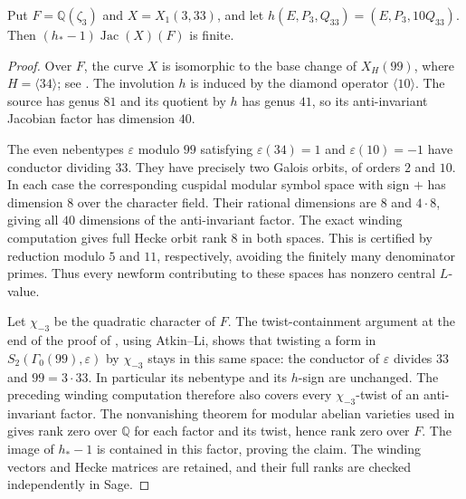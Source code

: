 \begin{lemma}\label{lem:decic333-finite-image}
Put $F=\mathbb Q(\zeta_3)$ and $X=X_1(3,33)$, and let
$h(E,P_3,Q_{33})=(E,P_3,10Q_{33})$.
Then $(h_*-1)\operatorname{Jac}(X)(F)$ is finite.
\end{lemma}
\begin{proof}
Over $F$, the curve $X$ is isomorphic to the base change of
$X_H(99)$, where $H=\langle34\rangle$; see \cite[Section~2]{DS}.
The involution $h$ is induced by the diamond operator
$\langle10\rangle$. The source has genus $81$ and its quotient
by $h$ has genus $41$, so its anti-invariant Jacobian factor
has dimension $40$.

The even nebentypes $\varepsilon$ modulo $99$ satisfying
$\varepsilon(34)=1$ and $\varepsilon(10)=-1$ have conductor
dividing $33$. They have precisely two Galois orbits, of orders
$2$ and $10$. In each case the corresponding cuspidal modular
symbol space with sign $+$ has dimension $8$ over the character
field. Their rational dimensions are $8$ and $4\cdot8$, giving
all $40$ dimensions of the anti-invariant factor.
The exact winding computation gives full Hecke orbit rank
$8$ in both spaces. This is certified by reduction modulo $5$
and $11$, respectively, avoiding the finitely many denominator
primes. Thus every newform contributing to these spaces has
nonzero central $L$-value.

Let $\chi_{-3}$ be the quadratic character of $F$.
The twist-containment argument at the end of the proof of
\cite[Theorem~4.1]{DS}, using Atkin--Li, shows that twisting a
form in $S_2(\Gamma_0(99),\varepsilon)$ by $\chi_{-3}$ stays in
this same space: the conductor of $\varepsilon$ divides $33$
and $99=3\cdot33$. In particular its nebentype and its $h$-sign
are unchanged. The preceding winding computation therefore
also covers every $\chi_{-3}$-twist of an anti-invariant factor.
The nonvanishing theorem for modular abelian varieties used
in \cite[Section~4]{DS} gives rank zero over $\mathbb Q$ for
each factor and its twist, hence rank zero over $F$.
The image of $h_*-1$ is contained in this factor, proving the
claim. The winding vectors and Hecke matrices are retained,
and their full ranks are checked independently in Sage.
\end{proof}
